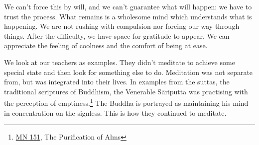 We can't force this by will, and we can't guarantee what will happen: we
have to trust the process. What remains is a wholesome mind which
understands what is happening. We are not rushing with compulsion nor
forcing our way through things. After the difficulty, we have space for
gratitude to appear. We can appreciate the feeling of coolness and the
comfort of being at ease.


We look at our teachers as examples. They didn't meditate to achieve
some special state and then look for something else to do. Meditation
was not separate from, but was integrated into their lives. In examples
from the suttas, the traditional scriptures of Buddhism, the Venerable
Sāriputta was practising with the perception of emptiness.\footnote{\href{https://suttacentral.net/mn151}{MN
  151}, The Purification of Alms} The Buddha is portrayed as maintaining
his mind in concentration on the signless. This is how they continued to
meditate.
